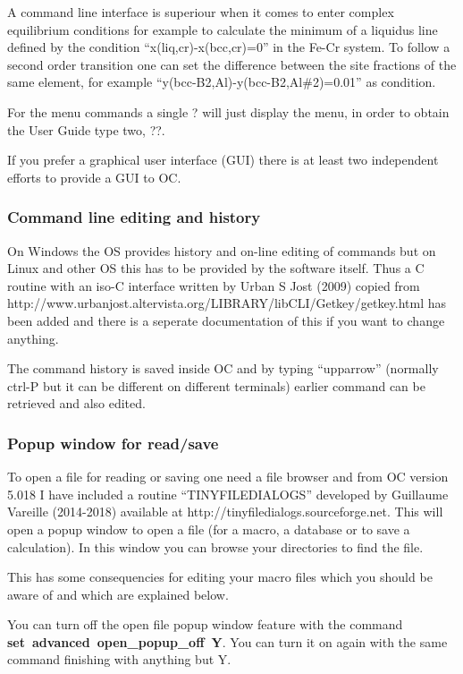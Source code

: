 \documentclass[11pt]{article}
\begin{document}
A command line interface is superiour when it comes to enter complex
equilibrium conditions for example to calculate the minimum of a
liquidus line defined by the condition ``x(liq,cr)-x(bcc,cr)=0'' in
the Fe-Cr system.  To follow a second order transition one can set the
difference between the site fractions of the same element, for example
``y(bcc-B2,Al)-y(bcc-B2,Al\#2)=0.01'' as condition.

For the menu commands a single ? will just display the menu, in order to
obtain the User Guide type two, ??.

If you prefer a graphical user interface (GUI) there is at least two
independent efforts to provide a GUI to OC.

\subsubsection{Command line editing and history}

On Windows the OS provides history and on-line editing of commands but
on Linux and other OS this has to be provided by the software itself.
Thus a C routine with an iso-C interface written by Urban S Jost
(2009) copied from
http://www.urbanjost.altervista.org/LIBRARY/libCLI/Getkey/getkey.html
has been added and there is a seperate documentation of this if you
want to change anything.

The command history is saved inside OC and by typing ``upparrow''
(normally ctrl-P but it can be different on different terminals)
earlier command can be retrieved and also edited.

\subsubsection{Popup window for read/save}\label{sc:popup}

To open a file for reading or saving one need a file browser and from
OC version 5.018 I have included a routine ``TINYFILEDIALOGS''
developed by Guillaume Vareille (2014-2018) available at
http://tinyfiledialogs.sourceforge.net.  This will open a popup window
to open a file (for a macro, a database or to save a calculation).  In
this window you can browse your directories to find the file.

This has some consequencies for editing your macro files which you
should be aware of and which are explained below.

You can turn off the open file popup window feature with the command
{\bf set~advanced~open\_popup\_off~Y}.  You can turn it on again with
the same command finishing with anything but Y.
\end{document}

